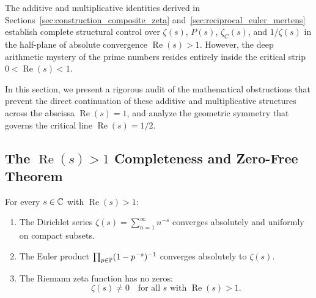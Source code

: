 The additive and multiplicative identities derived in Sections~\ref{sec:construction_composite_zeta} and~\ref{sec:reciprocal_euler_mertens} establish complete structural control over $\zeta(s)$, $P(s)$, $\zeta_C(s)$, and $1/\zeta(s)$ in the half-plane of absolute convergence $\operatorname{Re}(s) > 1$. However, the deep arithmetic mystery of the prime numbers resides entirely inside the critical strip $0 < \operatorname{Re}(s) < 1$. 

In this section, we present a rigorous audit of the mathematical obstructions that prevent the direct continuation of these additive and multiplicative structures across the abscissa $\operatorname{Re}(s) = 1$, and analyze the geometric symmetry that governs the critical line $\operatorname{Re}(s) = 1/2$.

\subsection{The $\operatorname{Re}(s) > 1$ Completeness and Zero-Free Theorem}

\begin{theorem}
\label{thm:zero_free_re_gt_1}
\leanok
For every $s \in \mathbb{C}$ with $\operatorname{Re}(s) > 1$:
\begin{enumerate}[label=(\alph*)]
  \item The Dirichlet series $\zeta(s) = \sum_{n=1}^\infty n^{-s}$ converges absolutely and uniformly on compact subsets.
  \item The Euler product $\prod_{p \in \mathbb{P}} (1 - p^{-s})^{-1}$ converges absolutely to $\zeta(s)$.
  \item The Riemann zeta function has no zeros:
  \begin{equation}
  \zeta(s) \neq 0 \quad \text{for all } s \text{ with } \operatorname{Re}(s) > 1.
  \end{equation}
\end{enumerate}
\end{theorem}


